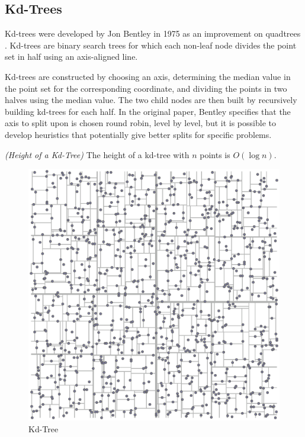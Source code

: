 \documentclass[mcs]{scsthesis}
\begin{document}
\subsection{Kd-Trees}

Kd-trees were developed by Jon Bentley in 1975 as an improvement on quadtrees
\cite{kdtree}. Kd-trees are binary search trees for which each non-leaf node
divides the point set in half using an axis-aligned line.

Kd-trees are constructed by choosing an axis, determining the median value in
the point set for the corresponding coordinate, and dividing the points in two
halves using the median value. The two child nodes are then built by
recursively building kd-trees for each half. In the original paper, Bentley
specifies that the axis to split upon is chosen round robin, level by level,
but it is possible to develop heuristics that potentially give better splits
for specific problems.

\begin{thm} \emph{(Height of a Kd-Tree)}
The height of a kd-tree with $n$ points is \(O(\log n)\).
\end{thm}

\begin{figure}
\begin{center}
\includegraphics[scale=0.35]{diagrams/kdtree.eps}
\caption{Kd-Tree}
\label{fig:kd_tree}
\end{center}
\end{figure}
\end{document}
